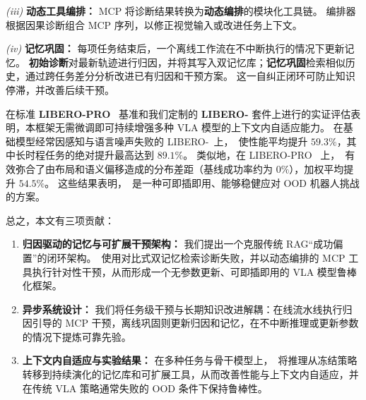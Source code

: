 \emph{(iii)} \textbf{动态工具编排：}
MCP 将诊断结果转换为\textbf{动态编排}的模块化工具链。
编排器根据因果诊断组合 MCP 序列，以修正视觉输入或改进任务上下文。

\emph{(iv)} \textbf{记忆巩固：}
每项任务结束后，一个离线工作流在不中断执行的情况下更新记忆。
\textbf{初始诊断}对最新轨迹进行归因，并将其写入双记忆库；\textbf{记忆巩固}检索相似历史，通过跨任务差分分析改进已有归因和干预方案。
这一自纠正闭环可防止知识停滞，并改善后续干预。

在标准 \textbf{LIBERO-PRO}~\cite{liberopro} 基准和我们定制的 \textbf{LIBERO-\sys} 套件上进行的实证评估表明，本框架无需微调即可持续增强多种 VLA 模型的上下文内自适应能力。
在基础模型经常因感知与语言噪声失败的 LIBERO-\sys\ 上，\sys\ 使性能平均提升 $\mathbf{59.3\%}$，其中长时程任务的绝对提升最高达到 $89.1\%$。
类似地，在 LIBERO-PRO~\cite{liberopro} 上，\sys\ 有效弥合了由布局和语义偏移造成的分布差距（基线成功率约为 $0\%$），加权平均提升 $\mathbf{54.5\%}$。
这些结果表明，\sys\ 是一种可即插即用、能够稳健应对 OOD 机器人挑战的方案。

总之，本文有三项贡献：
\begin{enumerate}
    \item \textbf{归因驱动的记忆与可扩展干预架构：}
    我们提出一个克服传统 RAG“成功偏置”的闭环架构。\sys\ 使用对比式双记忆检索诊断失败，并以动态编排的 MCP 工具执行针对性干预，从而形成一个无参数更新、可即插即用的 VLA 模型鲁棒化框架。

    \item \textbf{异步系统设计：}
    我们将任务级干预与长期知识改进解耦：在线流水线执行归因引导的 MCP 干预，离线巩固则更新归因和记忆，在不中断推理或更新参数的情况下提炼可靠先验。

    \item \textbf{上下文内自适应与实验结果：}
    在多种任务与骨干模型上，\sys\ 将推理从冻结策略转移到持续演化的记忆库和可扩展工具，从而改善性能与上下文内自适应，并在传统 VLA 策略通常失败的 OOD 条件下保持鲁棒性。
\end{enumerate}

\endinput
